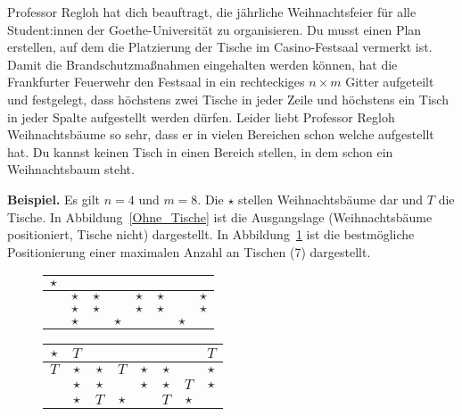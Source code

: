 \documentclass{uebung_cs}
\begin{document}
\begin{aufgabe}[Weihnachtsbäume]
    Professor Regloh hat dich beauftragt, die jährliche Weihnachtsfeier für alle Student:innen der Goethe-Universität zu organisieren. Du musst einen Plan erstellen, auf dem die Platzierung der Tische im Casino-Festsaal vermerkt ist. Damit die Brandschutzmaßnahmen eingehalten werden können, hat die Frankfurter Feuerwehr den Festsaal in ein rechteckiges $n \times m$ Gitter aufgeteilt und festgelegt, dass höchstens zwei Tische in jeder Zeile und höchstens ein Tisch in jeder Spalte aufgestellt werden dürfen. Leider liebt Professor Regloh Weihnachtsbäume so sehr, dass er in vielen Bereichen schon welche aufgestellt hat. Du kannst keinen Tisch in einen Bereich stellen, in dem schon ein Weihnachtsbaum steht.
    
    \textbf{Beispiel.} Es gilt $n = 4$ und $m = 8$. Die $\star$ stellen Weihnachtsbäume dar und $T$ die Tische. In Abbildung~\ref{Ohne_Tische} ist die Ausgangslage (Weihnachtsbäume positioniert, Tische nicht) dargestellt. In Abbildung~\ref{Mit Tischen} ist die bestmögliche Positionierung einer maximalen Anzahl an Tischen (7) dargestellt.
   
    \begin{figure}[h]
    \centering
    \begin{minipage}{0.4\textwidth}
    	\begin{tabular}{|c|c|c|c|c|c|c|c|}
    		\hline 
			$\star$ &  &  &  &  &  &  &  \\ 
    		\hline 
	    	& $\star$ & $\star$ &  & $\star$ & $\star$ &  & $\star$ \\ 
	    	\hline 
		    & $\star$ & $\star$ &  & $\star$ & $\star$ &  & $\star$ \\ 
    		\hline 
		    & $\star$ &  & $\star$ &  &  & $\star$ &  \\ 
    		\hline 
    	\end{tabular}
    	\caption{\label{Ohne_Tische}}
    \end{minipage}
    \begin{minipage}{0.4\textwidth}
    	\begin{tabular}{|c|c|c|c|c|c|c|c|}
		    \hline 
    		$\star$ & $T$ &  &  &  &  &  & $T$ \\ 
	    	\hline 
	    	$T$ & $\star$ & $\star$ & $T$ & $\star$ & $\star$ &  & $\star$ \\ 
		    \hline 
    		& $\star$ & $\star$ &  & $\star$ & $\star$ & $T$ & $\star$ \\ 
		    \hline 
    		& $\star$ & $T$ & $\star$ &  & $T$ & $\star$ &  \\ 
	    	\hline 
    	\end{tabular}
    	\caption{\label{Mit Tischen}}
    \end{minipage}
    \end{figure}
     

\end{aufgabe}
\end{document}
